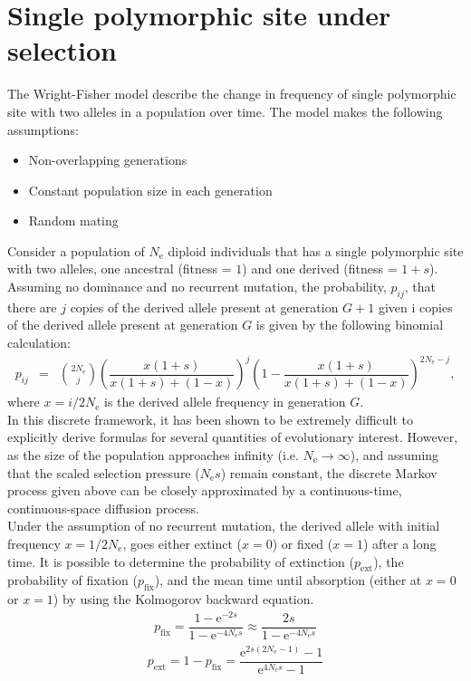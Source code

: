 \documentclass{article}
\author{Thibault Latrille.}
\newcommand{\e}{\mathrm{e}}
\newcommand{\Ne}{N_\mathrm{e}}
\begin{document}
	
\section*{Single polymorphic site under selection}
The Wright-Fisher model describe the change in frequency of single polymorphic site with two alleles in a population over time. The model makes the following assumptions:
\begin{itemize}
	\setlength\itemsep{-0.2em}
	\item Non-overlapping generations
	\item Constant population size in each generation
	\item Random mating
\end{itemize}

Consider a population of $\Ne$ diploid individuals that has a single polymorphic site with two alleles, one ancestral (fitness = $1$) and one derived (fitness = $1+s$). Assuming no dominance and no recurrent mutation, the probability, $p_{ij}$, that there are $j$ copies of the derived allele present at generation $G+1$ given i copies of the derived allele present at generation $G$ is given by the following binomial calculation:
\begin{eqnarray*}
	p_{ij} & = & \binom{2 \Ne}{j} \left( \dfrac{x(1+s)}{x(1+s) + (1-x)} \right)^j \left(1 - \dfrac{x(1+s)}{x(1+s) + (1-x)} \right)^{2 \Ne -j}, 
\end{eqnarray*}
where $x = i / 2 \Ne$ is the derived allele frequency in generation $G$.\\

In this discrete framework, it has been shown to be extremely difficult to explicitly derive formulas for several quantities of evolutionary interest. However, as the size of the population approaches infinity (i.e. $ \Ne \rightarrow \infty$), and assuming that the scaled selection pressure ($\Ne s $) remain constant, the discrete Markov process given above can be closely approximated by a continuous-time, continuous-space diffusion process.\\

Under the assumption of no recurrent mutation, the derived allele with initial frequency $x = 1 / 2 \Ne$, goes either extinct ($x=0$) or fixed ($x=1$) after a long time. It is possible to determine the probability of extinction ($p_{\mathrm{ext}}$), the probability of fixation ($p_{\mathrm{fix}}$), and the mean time until absorption (either at $x=0$ or $x=1$) by using the Kolmogorov backward equation. 
\begin{eqnarray*}
	p_{\mathrm{fix}} = \dfrac{1 - \e^{-2 s}}{1 - \e^{-4 \Ne s}} \approx  \dfrac{2 s }{1 - \e^{-4 \Ne s}}
\end{eqnarray*}
\begin{eqnarray*}
	p_{\mathrm{ext}} = 1 - p_{\mathrm{fix}} = \dfrac{ \e^{2s(2 \Ne -1) } - 1 }{\e^{4 \Ne s} - 1}
\end{eqnarray*}
\end{document}
